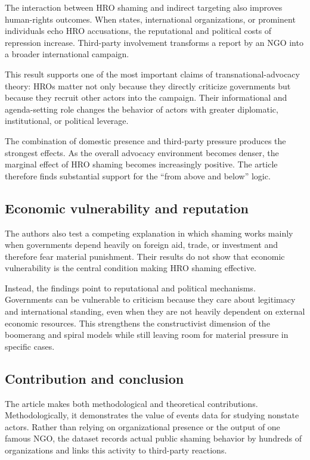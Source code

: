 The interaction between HRO shaming and indirect targeting also improves human-rights outcomes. When states, international organizations, or prominent individuals echo HRO accusations, the reputational and political costs of repression increase. Third-party involvement transforms a report by an NGO into a broader international campaign.

This result supports one of the most important claims of transnational-advocacy theory: HROs matter not only because they directly criticize governments but because they recruit other actors into the campaign. Their informational and agenda-setting role changes the behavior of actors with greater diplomatic, institutional, or political leverage.

The combination of domestic presence and third-party pressure produces the strongest effects. As the overall advocacy environment becomes denser, the marginal effect of HRO shaming becomes increasingly positive. The article therefore finds substantial support for the ``from above and below'' logic.

\subsection{Economic vulnerability and reputation}

The authors also test a competing explanation in which shaming works mainly when governments depend heavily on foreign aid, trade, or investment and therefore fear material punishment. Their results do not show that economic vulnerability is the central condition making HRO shaming effective.

Instead, the findings point to reputational and political mechanisms. Governments can be vulnerable to criticism because they care about legitimacy and international standing, even when they are not heavily dependent on external economic resources. This strengthens the constructivist dimension of the boomerang and spiral models while still leaving room for material pressure in specific cases.

\subsection{Contribution and conclusion}

The article makes both methodological and theoretical contributions. Methodologically, it demonstrates the value of events data for studying nonstate actors. Rather than relying on organizational presence or the output of one famous NGO, the dataset records actual public shaming behavior by hundreds of organizations and links this activity to third-party reactions.

